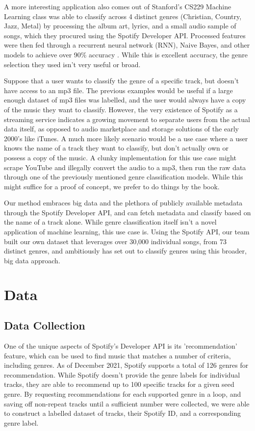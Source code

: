 \documentclass[conference]{IEEEtran}
\begin{document}
A more interesting application also comes out of Stanford's CS229 Machine Learning class was able to classify across 4 distinct genres (Christian, Country, Jazz, Metal) by processing the album art, lyrics, and a small audio sample of songs, which they procured using the Spotify Developer API. Processed features were then fed through a recurrent neural network (RNN), Naive Bayes, and other models to achieve over 90\% accuracy \cite{b5}. While this is excellent accuracy, the genre selection they used isn't very useful or broad.

Suppose that a user wants to classify the genre of a specific track, but doesn't have access to an mp3 file. The previous examples would be useful if a large enough dataset of mp3 files was labelled, and the user would always have a copy of the music they want to classify. However, the very existence of Spotify as a streaming service indicates a growing movement to separate users from the actual data itself, as opposed to audio marketplace and storage solutions of the early 2000's like iTunes. A much more likely scenario would be a use case where a user knows the name of a track they want to classify, but don't actually own or possess a copy of the music. A clunky implementation for this use case might scrape YouTube and illegally convert the audio to a mp3, then run the raw data through one of the previously mentioned genre classification models. While this might suffice for a proof of concept, we prefer to do things by the book.

Our method embraces big data and the plethora of publicly available metadata through the Spotify Developer API, and can fetch metadata and classify based on the name of a track alone. While genre classification itself isn't a novel application of machine learning, this use case is. Using the Spotify API, our team built our own dataset that leverages over 30,000 individual songs, from 73 distinct genres, and ambitiously has set out to classify genres using this broader, big data approach.

\section{Data}
\subsection{Data Collection}
One of the unique aspects of Spotify's Developer API is its 'recommendation' feature, which can be used to find music that matches a number of criteria, including genres. As of December 2021, Spotify supports a total of 126 genres for recommendation. While Spotify doesn't provide the genre labels for individual tracks, they are able to recommend up to 100 specific tracks for a given seed genre. By requesting recommendations for each supported genre in a loop, and saving off non-repeat tracks until a sufficient number were collected, we were able to construct a labelled dataset of tracks, their Spotify ID, and a corresponding genre label. 
\end{document}
